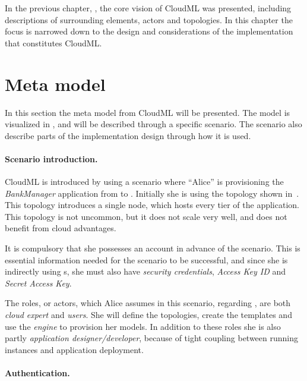 
In the previous chapter, , the core vision of CloudML was presented,
including descriptions of surrounding elements, \eg actors and topologies.
In this chapter the focus is narrowed down to the design and considerations 
of the implementation that constitutes CloudML.

\section{Meta model}

In this section the meta model from CloudML will be presented.
The model is visualized in , and will be described through a specific scenario.
The scenario also describe parts of the implementation design through how it is used.

\paragraph{Scenario introduction.}

CloudML is introduced by using a scenario where ``Alice'' is provisioning the 
\emph{BankManager} application from  to .
Initially she is using the topology shown in~.
This topology introduces a single node, which hosts every tier of the application.
This topology is not uncommon, but it does not scale very well, 
and does not benefit from cloud advantages.

It is compulsory that she possesses an  account in advance of the scenario.
This is essential information needed for the scenario to be successful,
and since she is indirectly using  s,
she must also have \emph{security credentials},
\ie \emph{Access Key ID} and \emph{Secret Access Key}.

The roles, or actors, which Alice assumes in this scenario, regarding ,
are both \emph{cloud expert} and \emph{users}.
She will define the topologies, create the templates and use 
the \emph{engine} to provision her models.
In addition to these roles she is also partly \emph{application designer/developer},
because of tight coupling between running instances and application deployment.

\paragraph{Authentication.}


